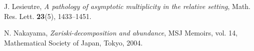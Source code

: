 \documentclass[11pt]{amsart}
\numberwithin{equation}{section}
\theoremstyle{definition}
\theoremstyle{definition}
\theoremstyle{definition}
\begin{document}
\begin{thebibliography}{99}

 J. Lesieutre, \textit{A pathology of asymptotic multiplicity in the relative setting}, Math. Res. Lett. \textbf{23}(5), 1433--1451.


 N. Nakayama, \textit{Zariski-decomposition and abundance}, MSJ Memoirs, vol. 14, Mathematical Society of Japan, Tokyo, 2004.





\end{thebibliography}












    
\end{document}

